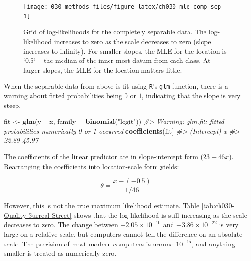 \documentclass[11pt, oneside, openany]{scrbook}
\newenvironment{Shaded}{\begin{snugshade}}{\end{snugshade}}
\newcommand{\CommentTok}[1]{\textcolor[rgb]{0.56,0.35,0.01}{\textit{#1}}}
\newcommand{\DataTypeTok}[1]{\textcolor[rgb]{0.13,0.29,0.53}{#1}}
\newcommand{\KeywordTok}[1]{\textcolor[rgb]{0.13,0.29,0.53}{\textbf{#1}}}
\newcommand{\NormalTok}[1]{#1}
\newcommand{\OperatorTok}[1]{\textcolor[rgb]{0.81,0.36,0.00}{\textbf{#1}}}
\newcommand{\StringTok}[1]{\textcolor[rgb]{0.31,0.60,0.02}{#1}}
\begin{document}
\begin{figure}

{\centering \texttt{[image: 030-methods\_files/figure-latex/ch030-mle-comp-sep-1]} 

}

\caption{Grid of log-likelihoods for the completely separable data. The log-likelihood increases to zero as the scale decreases to zero (slope increases to infinity). For smaller slopes, the MLE for the location is `0.5` -- the median of the inner-most datum from each class. At larger slopes, the MLE for the location matters little.}\label{fig:ch030-mle-comp-sep}
\end{figure}

When the separable data from above is fit using \texttt{R}'s \texttt{glm} function, there is a warning about fitted probabilities being \(0\) or \(1\), indicating that the slope is very steep.


\begin{Shaded}
\begin{Highlighting}[]
\NormalTok{fit <-}\StringTok{ }\KeywordTok{glm}\NormalTok{(y }\OperatorTok{~}\StringTok{ }\NormalTok{x, }\DataTypeTok{family =} \KeywordTok{binomial}\NormalTok{(}\StringTok{"logit"}\NormalTok{))}
\CommentTok{#> Warning: glm.fit: fitted probabilities numerically 0 or 1 occurred}
\KeywordTok{coefficients}\NormalTok{(fit)}
\CommentTok{#> (Intercept)           x }
\CommentTok{#>       22.89       45.97}
\end{Highlighting}
\end{Shaded}


The coefficients of the linear predictor are in slope-intercept form (\(23 + 46 x\)). Rearranging the coefficients into location-scale form yields:

\begin{equation}
  \theta = \frac{x - (-0.5)}{1/46}
  \label{eq:rglmmle}
\end{equation}

However, this is not the true maximum likelihood estimate. Table \ref{tab:ch030-Quality-Surreal-Street} shows that the log-likelihood is still increasing as the scale decreases to zero. The change between \(-2.05\times 10^{-10}\) and \(-3.86\times10^{-22}\) is very large on a relative scale, but computers cannot tell the difference on an absolute scale. The precision of most modern computers is around \(10^{-15}\), and anything smaller is treated as numerically zero.
\end{document}
